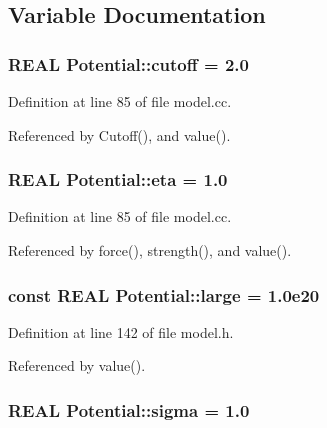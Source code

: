 \subsection{Variable Documentation}
\hypertarget{namespacePotential_c816a0c081c354415b591e3ae74b0503}{
\subsubsection[{cutoff}]{\setlength{\rightskip}{0pt plus 5cm}REAL {\bf Potential::cutoff} = 2.0}}
\label{namespacePotential_c816a0c081c354415b591e3ae74b0503}




Definition at line 85 of file model.cc.

Referenced by Cutoff(), and value().\hypertarget{namespacePotential_ad12486731103b0c2bdaa0bae4c54ef2}{
\subsubsection[{eta}]{\setlength{\rightskip}{0pt plus 5cm}REAL {\bf Potential::eta} = 1.0}}
\label{namespacePotential_ad12486731103b0c2bdaa0bae4c54ef2}




Definition at line 85 of file model.cc.

Referenced by force(), strength(), and value().\hypertarget{namespacePotential_dd2f57d7529aa1e7619eb04e15732890}{
\subsubsection[{large}]{\setlength{\rightskip}{0pt plus 5cm}const REAL {\bf Potential::large} = 1.0e20}}
\label{namespacePotential_dd2f57d7529aa1e7619eb04e15732890}




Definition at line 142 of file model.h.

Referenced by value().\hypertarget{namespacePotential_96d3dd69513cd1b108741e2211f882fc}{
\subsubsection[{sigma}]{\setlength{\rightskip}{0pt plus 5cm}REAL {\bf Potential::sigma} = 1.0}}
\label{namespacePotential_96d3dd69513cd1b108741e2211f882fc}




